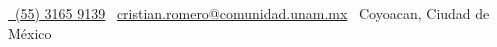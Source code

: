 \begin{makeheader}

  \dotfill{}

  \begin{center}
    {
      \footnotesize
      \hfill{}
      \hfill{}
      \hfill{}
      \href{tel:5531659139}{\faPhone~(55) 3165 9139}\hfill{}
      \faEnvelope~\href{mailto:cristian.romero@comunidad.unam.mx}{cristian.romero@comunidad.unam.mx}\hfill{}
      \faMapMarker~Coyoacan, Ciudad de México
    }
  \end{center}
\end{makeheader}
